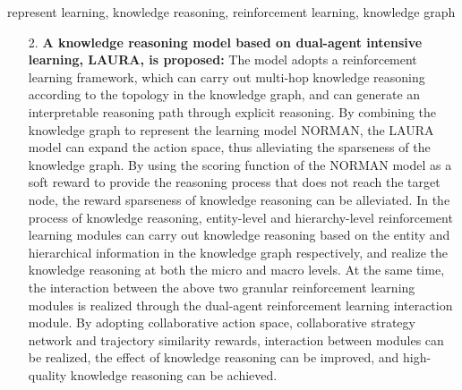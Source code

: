 \documentclass[algorithmlist, AutoFakeBold, AutoFakeSlant, figurelist, tablelist, nomlist, masters]{seuthesix}
\begin{document}
\begin{englishabstract}{represent learning, knowledge reasoning, reinforcement learning, knowledge graph}
\begin{itemize}
    Then, the causal inference module is used to construct a causal graph of the graph neural network module, and the method of causal intervention of neighborhood information is adopted to comprehensively consider a variety of factors such as hierarchical difference score, decision difference score, predictive confidence score and inference distance score to evaluate whether the current node receives information from the neighborhood nodes and improve stability of the model.
    At the same time, through the graph neural network module, the hierarchical information of the hierarchical information extraction module is used as the auxiliary, and the causal inference module is used to evaluate whether to receive neighborhood information. The completed training model can convert the input knowledge triples into the knowledge representation vectors and can be used for the task of knowledge reasoning.
    \item [2.]\textbf{A knowledge reasoning model based on dual-agent intensive learning, LAURA, is proposed:}
    The model adopts a reinforcement learning framework, which can carry out multi-hop knowledge reasoning according to the topology in the knowledge graph, and can generate an interpretable reasoning path through explicit reasoning.
    By combining the knowledge graph to represent the learning model NORMAN, the LAURA model can expand the action space, thus alleviating the sparseness of the knowledge graph. By using the scoring function of the NORMAN model as a soft reward to provide the reasoning process that does not reach the target node, the reward sparseness of knowledge reasoning can be alleviated.
    In the process of knowledge reasoning, entity-level and hierarchy-level reinforcement learning modules can carry out knowledge reasoning based on the entity and hierarchical information in the knowledge graph respectively, and realize the knowledge reasoning at both the micro and macro levels.
    At the same time, the interaction between the above two granular reinforcement learning modules is realized through the dual-agent reinforcement learning interaction module. By adopting collaborative action space, collaborative strategy network and trajectory similarity rewards, interaction between modules can be realized, the effect of knowledge reasoning can be improved, and high-quality knowledge reasoning can be achieved.
  \end{itemize}
\end{englishabstract} 

\tableofcontents
\mainmatter  %
\end{document}
